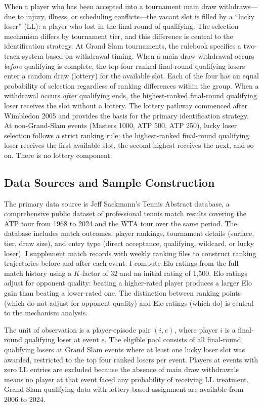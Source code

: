 When a player who has been accepted into a tournament main draw withdraws---due to injury, illness, or scheduling conflicts---the vacant slot is filled by a ``lucky loser'' (LL): a player who lost in the final round of qualifying. The selection mechanism differs by tournament tier, and this difference is central to the identification strategy. At Grand Slam tournaments, the rulebook specifies a two-track system based on withdrawal timing. When a main draw withdrawal occurs \textit{before} qualifying is complete, the top four ranked final-round qualifying losers enter a random draw (lottery) for the available slot. Each of the four has an equal probability of selection regardless of ranking differences within the group. When a withdrawal occurs \textit{after} qualifying ends, the highest-ranked final-round qualifying loser receives the slot without a lottery. The lottery pathway commenced after Wimbledon 2005 and provides the basis for the primary identification strategy. At non-Grand-Slam events (Masters 1000, ATP 500, ATP 250), lucky loser selection follows a strict ranking rule: the highest-ranked final-round qualifying loser receives the first available slot, the second-highest receives the next, and so on. There is no lottery component.

\subsection{Data Sources and Sample Construction}
\label{sec:data_sources}

The primary data source is Jeff Sackmann's Tennis Abstract database, a comprehensive public dataset of professional tennis match results covering the ATP tour from 1968 to 2024 and the WTA tour over the same period. The database includes match outcomes, player rankings, tournament details (surface, tier, draw size), and entry type (direct acceptance, qualifying, wildcard, or lucky loser). I supplement match records with weekly ranking files to construct ranking trajectories before and after each event. I compute Elo ratings from the full match history using a $K$-factor of 32 and an initial rating of 1,500. Elo ratings adjust for opponent quality: beating a higher-rated player produces a larger Elo gain than beating a lower-rated one. The distinction between ranking points (which do not adjust for opponent quality) and Elo ratings (which do) is central to the mechanism analysis.

The unit of observation is a player-episode pair $(i, e)$, where player $i$ is a final-round qualifying loser at event $e$. The eligible pool consists of all final-round qualifying losers at Grand Slam events where at least one lucky loser slot was awarded, restricted to the top four ranked losers per event. Players at events with zero LL entries are excluded because the absence of main draw withdrawals means no player at that event faced any probability of receiving LL treatment. Grand Slam qualifying data with lottery-based assignment are available from 2006 to 2024.

